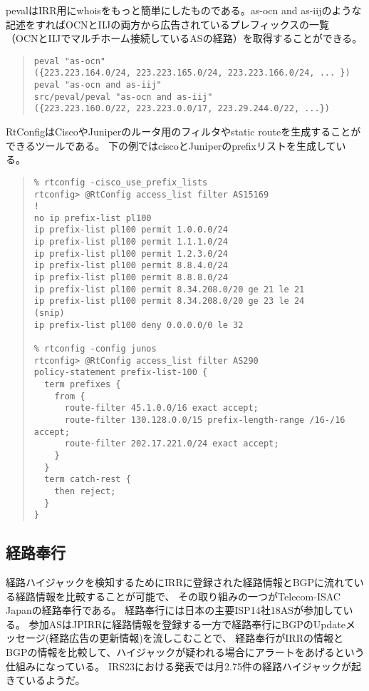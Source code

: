 pevalはIRR用にwhoisをもっと簡単にしたものである。as-ocn and as-iijのような記述をすればOCNとIIJの両方から広告されているプレフィックスの一覧
（OCNとIIJでマルチホーム接続しているASの経路）を取得することができる。

\begin{quote}
\begin{minilinespace}
\begin{verbatim}
peval "as-ocn"
({223.223.164.0/24, 223.223.165.0/24, 223.223.166.0/24, ... })
peval "as-ocn and as-iij"
src/peval/peval "as-ocn and as-iij"
({223.223.160.0/22, 223.223.0.0/17, 223.29.244.0/22, ...})
\end{verbatim}
\end{minilinespace}
\end{quote}

RtConfigはCiscoやJuniperのルータ用のフィルタやstatic routeを生成することができるツールである。
下の例ではciscoとJuniperのprefixリストを生成している。

\begin{quote}
\begin{minilinespace}
\begin{verbatim}
% rtconfig -cisco_use_prefix_lists
rtconfig> @RtConfig access_list filter AS15169
!
no ip prefix-list pl100
ip prefix-list pl100 permit 1.0.0.0/24
ip prefix-list pl100 permit 1.1.1.0/24
ip prefix-list pl100 permit 1.2.3.0/24
ip prefix-list pl100 permit 8.8.4.0/24
ip prefix-list pl100 permit 8.8.8.0/24
ip prefix-list pl100 permit 8.34.208.0/20 ge 21 le 21
ip prefix-list pl100 permit 8.34.208.0/20 ge 23 le 24
(snip)
ip prefix-list pl100 deny 0.0.0.0/0 le 32

% rtconfig -config junos
rtconfig> @RtConfig access_list filter AS290
policy-statement prefix-list-100 {
  term prefixes {
    from {
      route-filter 45.1.0.0/16 exact accept;
      route-filter 130.128.0.0/15 prefix-length-range /16-/16 accept;
      route-filter 202.17.221.0/24 exact accept;
    }
  }
  term catch-rest {
    then reject;
  }
}
\end{verbatim}
\end{minilinespace}
\end{quote}

\subsection{経路奉行}

経路ハイジャックを検知するためにIRRに登録された経路情報とBGPに流れている経路情報を比較することが可能で、
その取り組みの一つがTelecom-ISAC Japanの経路奉行である。
経路奉行には日本の主要ISP14社18ASが参加している。
参加ASはJPIRRに経路情報を登録する一方で経路奉行にBGPのUpdateメッセージ(経路広告の更新情報)を流しこむことで、
経路奉行がIRRの情報とBGPの情報を比較して、ハイジャックが疑われる場合にアラートをあげるという仕組みになっている。
IRS23における発表では月2.75件の経路ハイジャックが起きているようだ。

